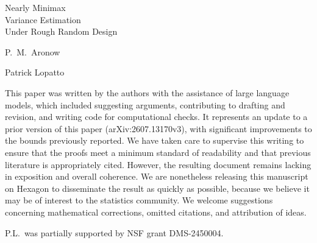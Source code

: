 \documentclass[12pt,oneside,openany]{book}
\numberwithin{equation}{chapter}
\theoremstyle{plain}
\theoremstyle{definition}
\theoremstyle{remark}
\newcommand{\npptitlepage}[2]{%
  \hypersetup{pageanchor=false}%
  \begin{titlepage}
  \centering\normalfont
  \vspace*{1.7in}
  {\large\strut\par}
  \vspace{1.05in}
  {\fontsize{28}{35}\selectfont #1\par}
  \vspace{1.1in}
  {\Large\def\\{\par\vspace{10pt}}#2\par}
  \vfill
  \end{titlepage}%
  \hypersetup{pageanchor=true}}
\newcommand{\1}{\mathbf 1}
\begin{document}
\frontmatter
\npptitlepage{Nearly Minimax\\ Variance Estimation\\ Under Rough Random Design}{P.\ M.\ Aronow\\ Patrick Lopatto}
\begin{authorsnote}
This paper was written by the authors with the assistance of large language models, which included suggesting arguments, contributing to drafting and revision, and writing code for computational checks. It represents an update to a prior version of this paper (arXiv:2607.13170v3), with significant improvements to the bounds previously reported. We have taken care to supervise this writing to ensure that the proofs meet a minimum standard of readability and that previous literature is appropriately cited. However, the resulting document remains lacking in exposition and overall coherence. We are nonetheless releasing this manuscript on Hexagon to disseminate the result as quickly as possible, because we believe it may be of interest to the statistics community. We welcome suggestions concerning mathematical corrections, omitted citations, and attribution of ideas.

P.L.\ was partially supported by NSF
grant DMS-2450004.
\end{authorsnote}
\begin{abstractpage}

\end{abstractpage}
\tableofcontents
\mainmatter

\backmatter
\setlength{\bibsep}{3pt plus 1pt minus 1pt}


\end{document}

